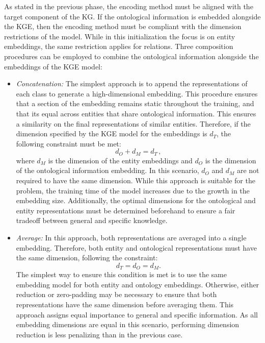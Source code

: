 As stated in the previous phase, the encoding method must be aligned with the target component of the KG. If the ontological information is embedded alongside the KGE, then the encoding method must be compliant with the dimension restrictions of the model. While in this initialization the focus is on entity embeddings, the same restriction applies for relations. Three composition procedures can be employed to combine the ontological information alongside the embeddings of the KGE model:
\begin{itemize}
    \item \textit{Concatenation:} The simplest approach is to append the representations of each class to generate a high-dimensional embedding. This procedure ensures that a section of the embedding remains static throughout the training, and that its equal across entities that share ontological information. This ensures a similarity on the final representations of similar entities. Therefore, if the dimension specified by the KGE model for the embeddings is $d_T$, the following constraint must be met:
    \begin{equation}
        d_O+d_M=d_T\,,
    \end{equation}
    where $d_M$ is the dimension of the entity embeddings and $d_O$ is the dimension of the ontological information embedding. In this scenario, $d_O$ and $d_M$ are not required to have the same dimension. While this approach is suitable for the problem, the training time of the model increases due to the growth in the embedding size. Additionally, the optimal dimensions for the ontological and entity representations must be determined beforehand to ensure a fair tradeoff between general and specific knowledge.
    
    \item \textit{Average:} In this approach, both representations are averaged into a single embedding. Therefore, both entity and ontological representations must have the same dimension, following the constraint:
    \begin{equation}
        d_T = d_O = d_M.
    \end{equation}
    The simplest way to ensure this condition is met is to use the same embedding model for both entity and ontology embeddings. Otherwise, either reduction or zero-padding may be necessary to ensure that both representations have the same dimension before averaging them. This approach assigns equal importance to general and specific information. As all embedding dimensions are equal in this scenario, performing dimension reduction is less penalizing than in the previous case.
    

\end{itemize}
